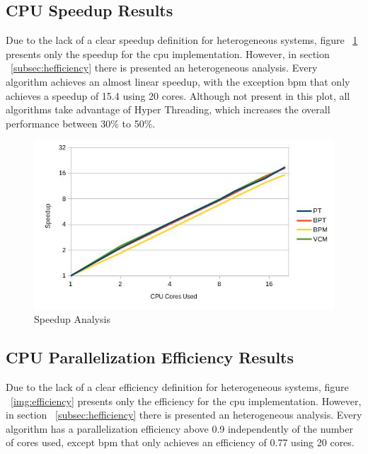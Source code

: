 \subsection{\label{subsec:cpuspeedup} CPU Speedup Results}

Due to the lack of a clear speedup definition for heterogeneous systems, figure ~\ref{img:speedup} presents only the speedup for the \gls{cpu} implementation. However, in section ~\ref{subsec:hefficiency} there is presented an heterogeneous analysis. Every algorithm achieves an almost linear speedup, with the exception \gls{bpm} that only achieves a speedup of 15.4 using 20 cores. Although not present in this plot, all algorithms take advantage of Hyper Threading, which increases the overall performance between 30\% to 50\%.

\begin{figure}[H]
\centering
\includegraphics[width=\linewidth]{img/speedup.jpg}
\caption{\label{img:speedup} Speedup Analysis}
\end{figure}

\subsection{\label{subsec:cpuefficiency} CPU Parallelization Efficiency Results}

Due to the lack of a clear efficiency definition for heterogeneous systems, figure ~\ref{img:efficiency} presents only the efficiency for the \gls{cpu} implementation. However, in section ~\ref{subsec:hefficiency} there is presented an heterogeneous analysis. Every algorithm has a parallelization efficiency above 0.9 independently of the number of cores used, except \gls{bpm} that only achieves an efficiency of 0.77 using 20 cores.

